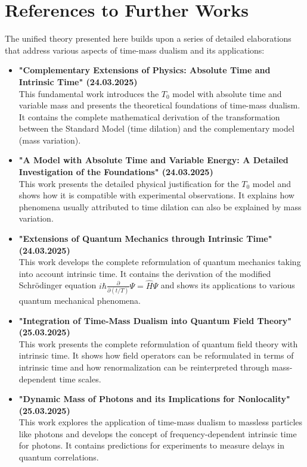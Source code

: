 \documentclass{article}
\begin{document}
	\section{References to Further Works}
	
	The unified theory presented here builds upon a series of detailed elaborations that address various aspects of time-mass dualism and its applications:
	
	\begin{itemize}
		\item \textbf{"Complementary Extensions of Physics: Absolute Time and Intrinsic Time" (24.03.2025)} \\
		This fundamental work introduces the $T_0$ model with absolute time and variable mass and presents the theoretical foundations of time-mass dualism. It contains the complete mathematical derivation of the transformation between the Standard Model (time dilation) and the complementary model (mass variation).
		
		\item \textbf{"A Model with Absolute Time and Variable Energy: A Detailed Investigation of the Foundations" (24.03.2025)} \\
		This work presents the detailed physical justification for the $T_0$ model and shows how it is compatible with experimental observations. It explains how phenomena usually attributed to time dilation can also be explained by mass variation.
		
		\item \textbf{"Extensions of Quantum Mechanics through Intrinsic Time" (24.03.2025)} \\
		This work develops the complete reformulation of quantum mechanics taking into account intrinsic time. It contains the derivation of the modified Schrödinger equation $i\hbar \frac{\partial}{\partial (t/T)} \Psi = \hat{H} \Psi$ and shows its applications to various quantum mechanical phenomena.
		
		\item \textbf{"Integration of Time-Mass Dualism into Quantum Field Theory" (25.03.2025)} \\
		This work presents the complete reformulation of quantum field theory with intrinsic time. It shows how field operators can be reformulated in terms of intrinsic time and how renormalization can be reinterpreted through mass-dependent time scales.
		
		\item \textbf{"Dynamic Mass of Photons and its Implications for Nonlocality" (25.03.2025)} \\
		This work explores the application of time-mass dualism to massless particles like photons and develops the concept of frequency-dependent intrinsic time for photons. It contains predictions for experiments to measure delays in quantum correlations.
		

\end{itemize}
\end{document}
